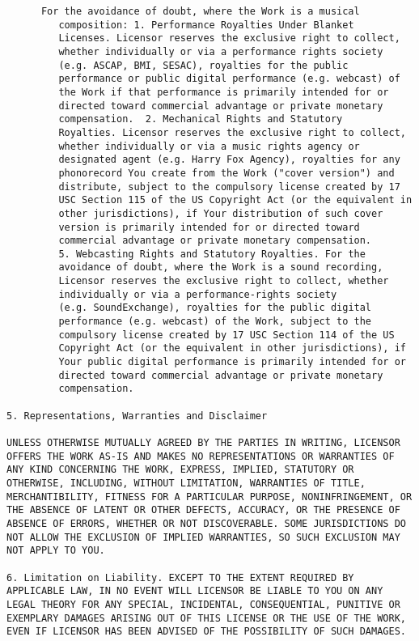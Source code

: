 \begin{lstlisting}
      For the avoidance of doubt, where the Work is a musical
         composition: 1. Performance Royalties Under Blanket
         Licenses. Licensor reserves the exclusive right to collect,
         whether individually or via a performance rights society
         (e.g. ASCAP, BMI, SESAC), royalties for the public
         performance or public digital performance (e.g. webcast) of
         the Work if that performance is primarily intended for or
         directed toward commercial advantage or private monetary
         compensation.  2. Mechanical Rights and Statutory
         Royalties. Licensor reserves the exclusive right to collect,
         whether individually or via a music rights agency or
         designated agent (e.g. Harry Fox Agency), royalties for any
         phonorecord You create from the Work ("cover version") and
         distribute, subject to the compulsory license created by 17
         USC Section 115 of the US Copyright Act (or the equivalent in
         other jurisdictions), if Your distribution of such cover
         version is primarily intended for or directed toward
         commercial advantage or private monetary compensation.
         5. Webcasting Rights and Statutory Royalties. For the
         avoidance of doubt, where the Work is a sound recording,
         Licensor reserves the exclusive right to collect, whether
         individually or via a performance-rights society
         (e.g. SoundExchange), royalties for the public digital
         performance (e.g. webcast) of the Work, subject to the
         compulsory license created by 17 USC Section 114 of the US
         Copyright Act (or the equivalent in other jurisdictions), if
         Your public digital performance is primarily intended for or
         directed toward commercial advantage or private monetary
         compensation.

5. Representations, Warranties and Disclaimer

UNLESS OTHERWISE MUTUALLY AGREED BY THE PARTIES IN WRITING, LICENSOR
OFFERS THE WORK AS-IS AND MAKES NO REPRESENTATIONS OR WARRANTIES OF
ANY KIND CONCERNING THE WORK, EXPRESS, IMPLIED, STATUTORY OR
OTHERWISE, INCLUDING, WITHOUT LIMITATION, WARRANTIES OF TITLE,
MERCHANTIBILITY, FITNESS FOR A PARTICULAR PURPOSE, NONINFRINGEMENT, OR
THE ABSENCE OF LATENT OR OTHER DEFECTS, ACCURACY, OR THE PRESENCE OF
ABSENCE OF ERRORS, WHETHER OR NOT DISCOVERABLE. SOME JURISDICTIONS DO
NOT ALLOW THE EXCLUSION OF IMPLIED WARRANTIES, SO SUCH EXCLUSION MAY
NOT APPLY TO YOU.

6. Limitation on Liability. EXCEPT TO THE EXTENT REQUIRED BY
APPLICABLE LAW, IN NO EVENT WILL LICENSOR BE LIABLE TO YOU ON ANY
LEGAL THEORY FOR ANY SPECIAL, INCIDENTAL, CONSEQUENTIAL, PUNITIVE OR
EXEMPLARY DAMAGES ARISING OUT OF THIS LICENSE OR THE USE OF THE WORK,
EVEN IF LICENSOR HAS BEEN ADVISED OF THE POSSIBILITY OF SUCH DAMAGES.


\end{lstlisting}
